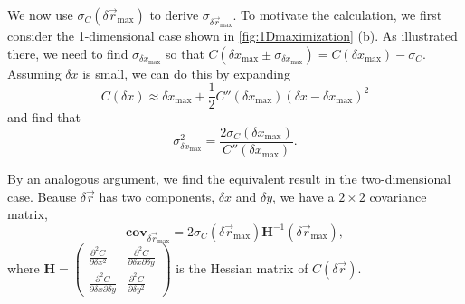 \documentclass{article}
\newcommand{\matrixbold}[1]{\mathbf{#1}}
\begin{document}
We now use $\sigma_C(\delta\vec{r}_\text{max})$ to derive $\sigma_{\delta\vec{r}_\text{max}}$.  To motivate the calculation, we first consider the 1-dimensional case shown in \cref{fig:1Dmaximization} (b).  As illustrated there, we need to find $\sigma_{\delta x_\text{max}}$ so that $C(\delta x_\text{max}\pm\sigma_{\delta x_\text{max}})=C(\delta x_\text{max})-\sigma_C$.  Assuming $\delta x$ is small, we can do this by expanding
\begin{equation}
C(\delta x)\approx\delta x_\text{max} + \frac{1}{2}C''(\delta x_\text{max})(\delta x - \delta x_\text{max})^2
\end{equation}
and find that
\begin{equation}
\sigma_{\delta x_\text{max}}^2=\frac{2\sigma_C(\delta x_\text{max})}{C''(\delta x_\text{max})}.
\end{equation}

By an analogous argument, we find the equivalent result in the two-dimensional case.  Beause $\delta\vec{r}$ has two components, $\delta x$ and $\delta y$, we have a $2\times2$ covariance matrix,
\begin{equation}
\matrixbold{cov}_{\delta\vec{r}_\text{max}}=2\sigma_C(\delta\vec{r}_\text{max})\matrixbold{H}^{-1}(\delta\vec{r}_\text{max}),
\end{equation}
where $ %
\matrixbold{H}=\begin{pmatrix}
\frac{\partial^2C}{\partial \delta x^2} & \frac{\partial^2C}{\partial \delta x \partial \delta y} \\
\frac{\partial^2C}{\partial \delta x \partial \delta y} & \frac{\partial^2C}{\partial \delta y^2}
\end{pmatrix}
$ %
is the Hessian matrix of $C(\delta\vec{r})$.
\end{document}

